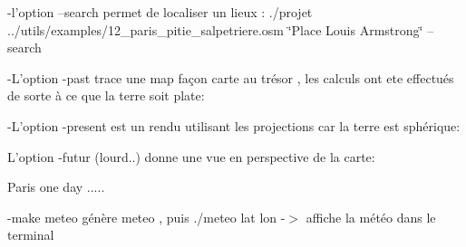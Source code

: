 -\/l'option --search permet de localiser un lieux \-: ./projet ../utils/examples/12\-\_\-paris\-\_\-pitie\-\_\-salpetriere.osm \char`\"{}\-Place Louis Armstrong\char`\"{} --search



-\/\-L'option -\/past trace une map façon carte au trésor , les calculs ont ete effectués de sorte à ce que la terre soit plate\-: 

-\/\-L'option -\/present est un rendu utilisant les projections car la terre est sphérique\-: 

L'option -\/futur (lourd..) donne une vue en perspective de la carte\-: 

Paris one day ..... 

-\/make meteo génère meteo , puis ./meteo lat lon -\/$>$ affiche la météo dans le terminal 